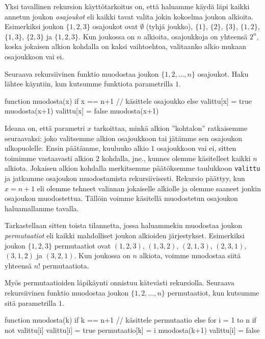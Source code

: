 Yksi tavallinen rekursion käyttötarkoitus on,
että haluamme käydä läpi kaikki annetun joukon \emph{osajoukot}
eli kaikki tavat valita jokin kokoelma joukon alkioita.
Esimerkiksi joukon $\{1,2,3\}$ osajoukot ovat
$\emptyset$ (tyhjä joukko), $\{1\}$, $\{2\}$, $\{3\}$,
$\{1,2\}$, $\{1,3\}$, $\{2,3\}$ ja $\{1,2,3\}$.
Kun joukossa on $n$ alkioita, osa\-joukkoja on yhteensä $2^n$,
koska jokaisen alkion kohdalla on kaksi vaihtoehtoa,
valitaanko alkio mukaan osajoukkoon vai ei.

Seuraava rekursiivinen funktio muodostaa joukon
$\{1,2,\dots,n\}$ osajoukot.
Haku lähtee käyntiin, kun kutsumme funktiota
parametrilla $1$.

\begin{code}
function muodosta(x)
    if x == n+1
        // käsittele osajoukko
    else
        valittu[x] = true
        muodosta(x+1)
        valittu[x] = false
        muodosta(x+1)
\end{code}

Ideana on, että parametri $x$ tarkoittaa, minkä alkion
''kohtalon'' ratkaisemme seuraavaksi: joko valitsemme alkion
osajoukkoon tai jätämme sen osa\-joukon ulkopuolelle.
Ensin päätämme, kuuluuko alkio $1$ osajoukkoon vai ei,
sitten toimimme vastaavasti alkion $2$ kohdalla, jne.,
kunnes olemme käsitelleet kaikki $n$ alkiota.
Jokaisen alkion kohdalla merkitsemme päätöksemme taulukkoon
\texttt{valittu} ja jatkamme osajoukon muodostamista rekursiivisesti.
Rekursio päät\-tyy, kun $x=n+1$ eli olemme tehneet valinnan
jokaiselle alkiolle ja olemme saaneet jonkin osajoukon muodostettua.
Tällöin voimme käsitellä muodostetun osajoukon haluamallamme tavalla.

Tarkastellaan sitten toista tilannetta, jossa haluammekin
muodostaa joukon \emph{permutaatiot}
eli kaikki mahdolliset joukon alkioiden järjestykset.
Esimerkiksi joukon $\{1,2,3\}$ permutaatiot ovat
$(1,2,3)$, $(1,3,2)$, $(2,1,3)$, $(2,3,1)$, $(3,1,2)$ ja $(3,2,1)$.
Kun joukossa on $n$ alkiota, voimme muodostaa siitä yhteensä $n!$ permutaatiota.

Myös permutaatioiden läpikäynti onnistuu kätevästi rekursiolla.
Seuraava rekursiivinen funktio muodostaa joukon $\{1,2,\dots,n\}$ permutaatiot,
kun kutsumme sitä parametrilla $1$.

\begin{code}
function muodosta(k)
    if k == n+1
        // käsittele permutaatio
    else
        for i = 1 to n
            if not valittu[i]
                valittu[i] = true
                permutaatio[k] = i
                muodosta(k+1)
                valittu[i] = false
\end{code}

